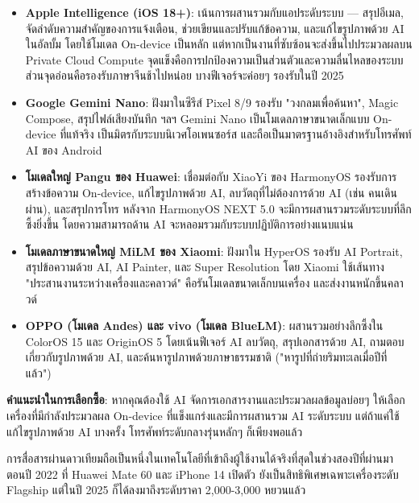 \begin{itemize}
  \item \textbf{Apple Intelligence (iOS 18+)}: เน้นการผสานรวมกับแอประดับระบบ — สรุปอีเมล, จัดลำดับความสำคัญของการแจ้งเตือน, ช่วยเขียนและปรับแก้ข้อความ, และแก้ไขรูปภาพด้วย AI ในอัลบั้ม โดยใช้โมเดล On-device เป็นหลัก แต่หากเป็นงานที่ซับซ้อนจะส่งขึ้นไปประมวลผลบน Private Cloud Compute จุดแข็งคือการปกป้องความเป็นส่วนตัวและความลื่นไหลของระบบ ส่วนจุดอ่อนคือรองรับภาษาจีนช้าไปหน่อย บางฟีเจอร์จะค่อยๆ รองรับในปี 2025
  \item \textbf{Google Gemini Nano}: ฝังมาในซีรีส์ Pixel 8/9 รองรับ "วงกลมเพื่อค้นหา", Magic Compose, สรุปไฟล์เสียงบันทึก ฯลฯ Gemini Nano เป็นโมเดลภาษาขนาดเล็กแบบ On-device ที่แท้จริง เป็นมิตรกับระบบนิเวศโอเพนซอร์ส และถือเป็นมาตรฐานอ้างอิงสำหรับโทรศัพท์ AI ของ Android
  \item \textbf{โมเดลใหญ่ Pangu ของ Huawei}: เชื่อมต่อกับ XiaoYi ของ HarmonyOS รองรับการสร้างข้อความ On-device, แก้ไขรูปภาพด้วย AI, ลบวัตถุที่ไม่ต้องการด้วย AI (เช่น คนเดินผ่าน), และสรุปการโทร หลังจาก HarmonyOS NEXT 5.0 จะมีการผสานรวมระดับระบบที่ลึกซึ้งยิ่งขึ้น โดยความสามารถด้าน AI จะหลอมรวมกับระบบปฏิบัติการอย่างแนบแน่น
  \item \textbf{โมเดลภาษาขนาดใหญ่ MiLM ของ Xiaomi}: ฝังมาใน HyperOS รองรับ AI Portrait, สรุปข้อความด้วย AI, AI Painter, และ Super Resolution โดย Xiaomi ใช้เส้นทาง "ประสานงานระหว่างเครื่องและคลาวด์" คือรันโมเดลขนาดเล็กบนเครื่อง และส่งงานหนักขึ้นคลาวด์
  \item \textbf{OPPO (โมเดล Andes) และ vivo (โมเดล BlueLM)}: ผสานรวมอย่างลึกซึ้งใน ColorOS 15 และ OriginOS 5 โดยเน้นฟีเจอร์ AI ลบวัตถุ, สรุปเอกสารด้วย AI, ถามตอบเกี่ยวกับรูปภาพด้วย AI, และค้นหารูปภาพด้วยภาษาธรรมชาติ ("หารูปที่ถ่ายริมทะเลเมื่อปีที่แล้ว")
\end{itemize}

\textbf{คำแนะนำในการเลือกซื้อ}: หากคุณต้องใช้ AI จัดการเอกสารงานและประมวลผลข้อมูลบ่อยๆ ให้เลือกเครื่องที่มีกำลังประมวลผล On-device ที่แข็งแกร่งและมีการผสานรวม AI ระดับระบบ แต่ถ้าแค่ใช้แก้ไขรูปภาพด้วย AI บางครั้ง โทรศัพท์ระดับกลางรุ่นหลักๆ ก็เพียงพอแล้ว


การสื่อสารผ่านดาวเทียมถือเป็นหนึ่งในเทคโนโลยีที่เข้าถึงผู้ใช้งานได้จริงที่สุดในช่วงสองปีที่ผ่านมา ตอนปี 2022 ที่ Huawei Mate 60 และ iPhone 14 เปิดตัว ยังเป็นสิทธิพิเศษเฉพาะเครื่องระดับ Flagship แต่ในปี 2025 ก็ได้ลงมาถึงระดับราคา 2,000-3,000 หยวนแล้ว

